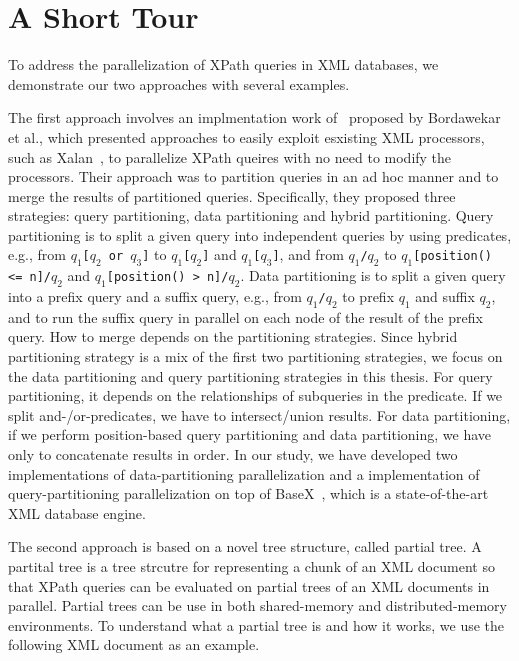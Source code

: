 \section{A Short Tour}

To address the parallelization of XPath queries in XML databases, we demonstrate
our two approaches with several examples.

The first approach involves an implmentation work of~\cite{BoLS09} proposed by
Bordawekar et al., which presented approaches to easily exploit esxisting XML
processors, such as Xalan~\cite{xalan}, to parallelize XPath queires with no
need to modify  the processors. Their approach was to partition queries in an ad
hoc manner and to merge the results of partitioned queries. Specifically, they
proposed three strategies: query partitioning, data partitioning and hybrid
partitioning. Query partitioning is to split a given query into independent
queries by using predicates, e.g., from \texttt{$q_1$[$q_2$ or $q_3$]} to
\texttt{$q_1$[$q_2$]} and \texttt{$q_1$[$q_3$]}, and from \texttt{$q_1$/$q_2$}
to \texttt{$q_1$[position() <= n]/$q_2$} and \texttt{$q_1$[position() >
	n]/$q_2$}. Data partitioning is to split a given query into a prefix query and a
suffix query, e.g., from \texttt{$q_1$/$q_2$} to prefix $q_1$ and suffix $q_2$,
and to run the suffix query in parallel on each node of the result of the prefix
query. How to merge depends on the partitioning strategies.  Since hybrid
partitioning strategy is a mix of the first two partitioning strategies, we
focus on the data partitioning and query partitioning strategies in this thesis.
For query partitioning, it depends on the relationships of subqueries in the
predicate. If we split and-/or-predicates, we have to intersect/union results.
For data partitioning, if we perform position-based query partitioning and data
partitioning, we have only to concatenate results in order. In our study, we
have developed two implementations of data-partitioning parallelization and a
implementation of query-partitioning parallelization on top of
BaseX~\cite{basex864}, which is a state-of-the-art XML database engine.

The second approach is based on a novel tree structure, called partial tree. A
partital tree is a tree strcutre for representing a chunk of an XML document so
that XPath queries can be evaluated on partial trees of an XML documents in
parallel. Partial trees can be use in both shared-memory and distributed-memory
environments. To understand what a partial tree is and how it works, we use the
following XML document as an example.


